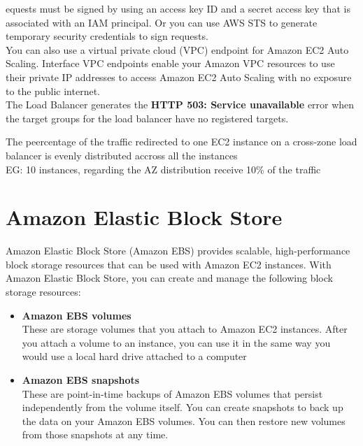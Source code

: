 \documentclass[12pt, letterpaper, twoside]{article}
\begin{document}
equests must be signed by using an access key ID and a secret access key that is associated with an IAM principal. Or you can use AWS STS to 
generate temporary security credentials to sign requests.\\

You can also use a virtual private cloud (VPC) endpoint for Amazon EC2 Auto Scaling. Interface VPC endpoints enable your Amazon VPC resources 
to use their private IP addresses to access Amazon EC2 Auto Scaling with no exposure to the public internet.\\

The Load Balancer generates the \textbf{HTTP 503: Service unavailable} error when the target groups for the load balancer have no registered targets.

The peercentage of the traffic redirected to one EC2 instance on a cross-zone load balancer is evenly distributed accross all the instances\\
EG: 10 instances, regarding the AZ distribution receive 10\% of the traffic

\section{Amazon Elastic Block Store}
Amazon Elastic Block Store (Amazon EBS) provides scalable, high-performance block storage resources that can be used with Amazon EC2 
instances. With Amazon Elastic Block Store, you can create and manage the following block storage resources:

\begin{itemize}
	\item \textbf{Amazon EBS volumes}\\
		These are storage volumes that you attach to Amazon EC2 instances. After you attach a volume to an instance, you can use it 
		in the same way you would use a local hard drive attached to a computer
	\item \textbf{Amazon EBS snapshots}\\
		These are point-in-time backups of Amazon EBS volumes that persist independently from the volume itself. You can create 
		snapshots to back up the data on your Amazon EBS volumes. You can then restore new volumes from those snapshots at any time.
\end{itemize}
\end{document}
